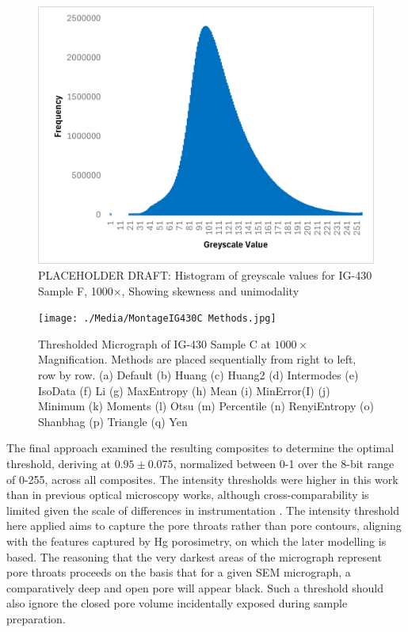 \documentclass[review]{elsarticle}
\begin{document}
    \begin{figure}
		\centering
    \includegraphics[width=0.9\columnwidth]{./Media/IG430F Greyscale Histogram.png}
		\caption{PLACEHOLDER DRAFT: Histogram of greyscale values for IG-430 Sample F, 1000×, Showing skewness and unimodality}
		\label{fig:histogramnobimodal}
	\end{figure} 

	\begin{figure}[!htbp]
		\centering
		\texttt{[image: ./Media/MontageIG430C Methods.jpg]}
		\caption{Thresholded Micrograph of IG-430 Sample C at $1000\times$ Magnification. Methods are placed sequentially from right to left, row by row. 
      (a) Default
			(b) Huang
			(c) Huang2
			(d) Intermodes
			(e) IsoData
			(f) Li
			(g) MaxEntropy
			(h) Mean
			(i) MinError(I)
			(j) Minimum
			(k) Moments
			(l) Otsu
			(m) Percentile
			(n) RenyiEntropy
			(o) Shanbhag
			(p) Triangle
			(q) Yen}
		\label{fig:Try All Thresholding Methods}
	\end{figure}  

	The final approach examined the resulting composites to determine the optimal
	threshold, deriving at $0.95 \pm 0.075$, normalized between 0-1 over the 8-bit
	range of 0-255, across all composites. The intensity thresholds were higher in
	this work than in previous optical microscopy works, although
	cross-comparability is limited given the scale of differences in
	instrumentation \citep{Kane2011a,Huang2019}. The intensity threshold here
	applied aims to capture the pore throats rather than pore contours, aligning
	with the features captured by Hg porosimetry, on which the later modelling is
	based. The reasoning that the very darkest areas of the micrograph represent
	pore throats proceeds on the basis that for a given SEM micrograph, a
	comparatively deep and open pore will appear black. Such a threshold should
	also ignore the closed pore volume incidentally exposed during sample
	preparation.
\end{document}
